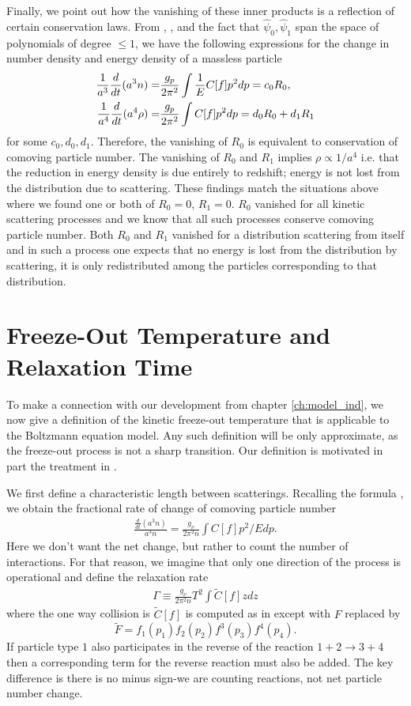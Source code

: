 Finally, we point out how the vanishing of these inner products is a reflection of certain conservation laws. From , , and the fact that $\hat\psi_0,\hat\psi_1$ span the space of polynomials of degree $\leq 1$, we have the following expressions for the change in number density and energy density of a massless particle
\begin{align}
\frac{1}{a^3} \frac{d}{dt}(a^3n)=&\frac{g_p}{2\pi^2}\int \frac{1}{E}C[f]p^2dp=c_0 R_0,\\
\frac{1}{a^4}\frac{d}{dt}(a^4\rho)=&\frac{g_p}{2\pi^2}\int C[f] p^2dp=d_0R_0+d_1R_1\notag
\end{align}
for some $c_0,d_0,d_1$. Therefore, the vanishing of $R_0$ is equivalent to conservation of comoving particle number.  The vanishing of $R_0$ and $R_1$ implies $\rho\propto 1/a^4$ i.e. that the reduction in energy density is due entirely to redshift; energy is not lost from the distribution due to scattering.  These findings match the situations above where we found one or both of $R_0=0$, $R_1=0$.  $R_0$ vanished for all kinetic scattering processes and we know that all such processes conserve comoving particle number.  Both $R_0$ and $R_1$ vanished for a distribution scattering from itself and in such a process one expects that no energy is lost from the distribution by scattering, it is only redistributed among the particles corresponding to that distribution.


\section{Freeze-Out Temperature and Relaxation Time}
To make a connection with our development from chapter \ref{ch:model_ind}, we now give a definition of the kinetic freeze-out temperature that is applicable to the Boltzmann equation model. Any such definition will be only approximate, as the freeze-out process is not a sharp transition.  Our definition is motivated in part the treatment in \cite{kolb}. 

We first define a characteristic length between scatterings. Recalling the formula , we obtain the fractional rate of change of comoving particle number
\begin{align}
\frac{\frac{d}{dt}(a^3 n)}{a^3n}=\frac{g_\nu}{2\pi^2n}\int C[f]p^2/Edp.
\end{align}
Here we don't want the net change, but rather to count the number of interactions.  For that reason, we imagine that only one direction of the process is operational and define the relaxation rate
\begin{align}
\Gamma\equiv\frac{g_\nu}{2\pi^2n}T^2\int \tilde C[f]zdz
\end{align}
where the one way collision is $\tilde C[f]$ is computed as in  except with $F$ replaced by 
\begin{equation}
\tilde F=f_1(p_1)f_2(p_2)f^3(p_3)f^4(p_4).
\end{equation}
If particle type $1$ also participates in the reverse of the reaction $1+2\rightarrow 3+4$ then a corresponding term for the reverse reaction must also be added.  The key difference is there is no minus sign-we are counting reactions, not net particle number change.

